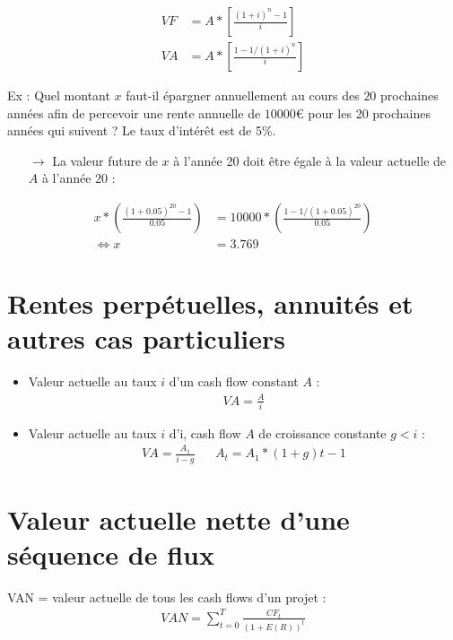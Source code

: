 \begin{align*}
    VF &= A * \left[ \frac{(1 + i)^n - 1}{i}         \right] \\
    VA &= A * \left[ \frac{1 - 1/(1+i)^n}{i} \right]
\end{align*}

Ex : Quel montant $x$ faut-il épargner annuellement au cours des $20$ prochaines années afin de percevoir une rente annuelle de $10000$€ pour les 20 prochaines années qui suivent ? Le taux d'intérêt est de 5\%.
\begin{itemize}
    \item[$\rightarrow$] La valeur future de $x$ à l'année 20 doit être égale à la valeur actuelle de $A$ à l'année $20$ :
\end{itemize}
\begin{align*}
    x * \left( \frac{(1 + 0.05)^{20} - 1}{0.05} \right) &= 10000 * \left( \frac{1 - 1/(1 + 0.05)^{20}}{0.05} \right) \\
    \Leftrightarrow x &= 3.769
\end{align*}

\section{Rentes perpétuelles, annuités et autres cas particuliers}

\begin{itemize}
    \item Valeur actuelle au taux $i$ d'un cash flow constant $A$ :
    \begin{align*}
        VA = \frac{A}{i}
    \end{align*}
    \item Valeur actuelle au taux $i$ d'i, cash flow $A$ de croissance constante $g < i$ :
    \begin{align*}
        VA = \frac{A_1}{i - g} && A_t = A_1 * (1 + g) t - 1
    \end{align*}
\end{itemize}

\section{Valeur actuelle nette d'une séquence de flux}

VAN = valeur actuelle de tous les cash flows d'un projet :
\begin{align*}
    VAN = \sum_{t = 0}^T \frac{CF_t}{(1 + E(R))^t}
\end{align*}

